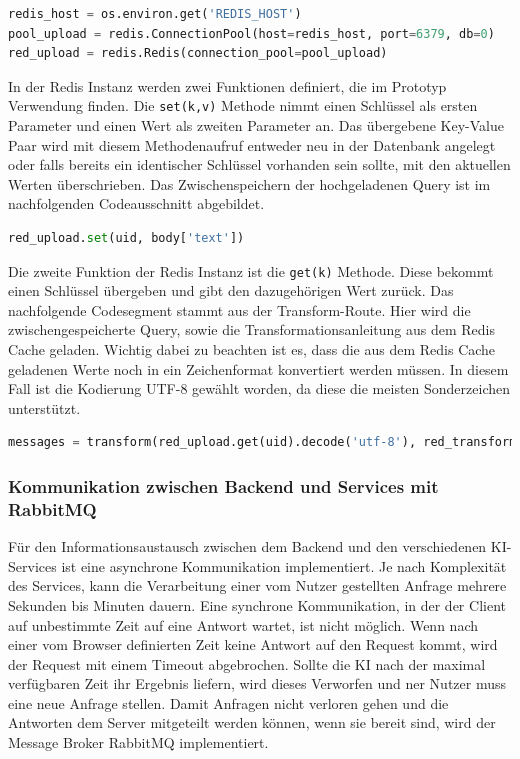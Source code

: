 \begin{lstlisting}[language=Python, caption={Aufsetzen der Redis-Verbindung}]
redis_host = os.environ.get('REDIS_HOST')
pool_upload = redis.ConnectionPool(host=redis_host, port=6379, db=0)
red_upload = redis.Redis(connection_pool=pool_upload)
\end{lstlisting}

In der Redis Instanz werden zwei Funktionen definiert, die im Prototyp Verwendung finden. Die \texttt{set(k,v)} Methode nimmt einen Schlüssel als ersten Parameter und einen Wert als zweiten Parameter an. Das übergebene Key-Value Paar wird mit diesem Methodenaufruf entweder neu in der Datenbank angelegt oder falls bereits ein identischer Schlüssel vorhanden sein sollte, mit den aktuellen Werten überschrieben. Das Zwischenspeichern der hochgeladenen Query ist im nachfolgenden Codeausschnitt abgebildet.  

\begin{lstlisting}[language=Python, caption={Set-Funktion aus Redis}]
red_upload.set(uid, body['text'])
\end{lstlisting}

Die zweite Funktion der Redis Instanz ist die \texttt{get(k)} Methode. Diese bekommt einen Schlüssel übergeben und gibt den dazugehörigen Wert zurück. Das nachfolgende Codesegment stammt aus der Transform-Route. Hier wird die zwischengespeicherte Query, sowie die Transformationsanleitung aus dem Redis Cache geladen. Wichtig dabei zu beachten ist es, dass die aus dem Redis Cache geladenen Werte noch in ein Zeichenformat konvertiert werden müssen. In diesem Fall ist die Kodierung UTF-8 gewählt worden, da diese die meisten Sonderzeichen unterstützt.

\begin{lstlisting}[language=Python, caption={Get-Funktion aus Redis}]
messages = transform(red_upload.get(uid).decode('utf-8'), red_transform.get(uid))
\end{lstlisting}

\subsubsection{Kommunikation zwischen Backend und Services mit RabbitMQ}
Für den Informationsaustausch zwischen dem Backend und den verschiedenen KI-Services ist eine asynchrone Kommunikation implementiert. Je nach Komplexität des Services, kann die Verarbeitung einer vom Nutzer gestellten Anfrage mehrere Sekunden bis Minuten dauern. Eine synchrone Kommunikation, in der der Client auf unbestimmte Zeit auf eine Antwort wartet, ist nicht möglich. Wenn nach einer vom Browser definierten Zeit keine Antwort auf den Request kommt, wird der Request mit einem Timeout abgebrochen. Sollte die KI nach der maximal verfügbaren Zeit ihr Ergebnis liefern, wird dieses Verworfen und ner Nutzer muss eine neue Anfrage stellen. Damit Anfragen nicht verloren gehen und die Antworten dem Server mitgeteilt werden können, wenn sie bereit sind, wird der Message Broker RabbitMQ implementiert. 

